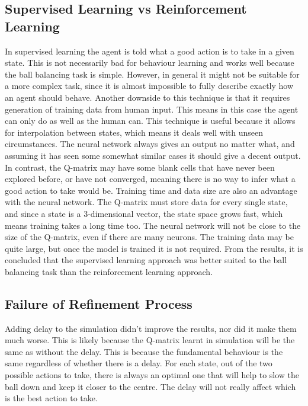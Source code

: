 \documentclass[12pt,a4paper]{article}
\begin{document}
\subsection{Supervised Learning vs Reinforcement Learning}
In supervised learning the agent is told what a good action is to take in a given state. This is not necessarily bad for behaviour learning and works well because the ball balancing task is simple. However, in general it might not be suitable for a more complex task, since it is almost impossible to fully describe exactly how an agent should behave. Another downside to this technique is that it requires generation of training data from human input. This means in this case the agent can only do as well as the human can. 
This technique is useful because it allows for interpolation between states, which means it deals well with unseen circumstances. The neural network always gives an output no matter what, and assuming it has seen some somewhat similar cases it should give a decent output. In contrast, the Q-matrix may have some blank cells that have never been explored before, or have not converged, meaning there is no way to infer what a good action to take would be. Training time and data size are also an advantage with the neural network. The Q-matrix must store data for every single state, and since a state is a 3-dimensional vector, the state space grows fast, which means training takes a long time too. The neural network will not be close to the size of the Q-matrix, even if there are many neurons. The training data may be quite large, but once the model is trained it is not required. 
From the results, it is concluded that the supervised learning approach was better suited to the ball balancing task than the reinforcement learning approach. 

\subsection{Failure of Refinement Process}
Adding delay to the simulation didn't improve the results, nor did it make them much worse. This is likely because the Q-matrix learnt in simulation will be the same as without the delay. This is because the fundamental behaviour is the same regardless of whether there is a delay. For each state, out of the two possible actions to take, there is always an optimal one that will help to slow the ball down and keep it closer to the centre. The delay will not really affect which is the best action to take.
\end{document}
